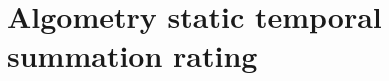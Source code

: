 \section{Algometry static temporal summation rating}
\label{sec:AlgometryStaticTemporalSummationRating}
